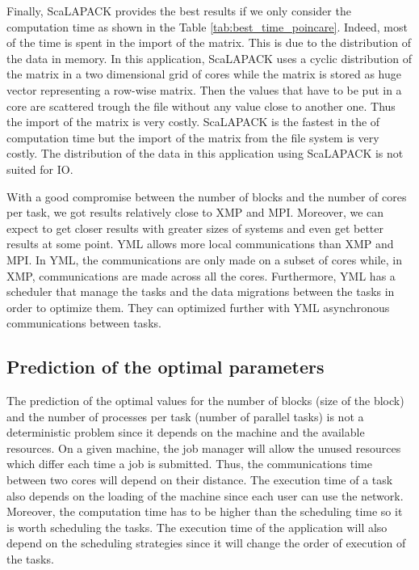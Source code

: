 Finally, ScaLAPACK provides the best results if we only consider the computation time as shown in the Table \ref{tab:best_time_poincare}.
Indeed, most of the time is spent in the import of the matrix.
This is due to the distribution of the data in memory.
In this application, ScaLAPACK uses a cyclic distribution of the matrix in a two dimensional grid of cores while the matrix is stored as huge vector representing a row-wise matrix.
Then the values that have to be put in a core are scattered trough the file without any value close to another one.
Thus the import of the matrix is very costly.
ScaLAPACK is the fastest in the of computation time but the import of the matrix from the file system is very costly.
The distribution of the data in this application using ScaLAPACK is not suited for IO.

With a good compromise between the number of blocks and the number of cores per task, we got results relatively close to XMP and MPI.
Moreover, we can expect to get closer results with greater sizes of systems and even get better results at some point.
YML allows more local communications than XMP and MPI.
In YML, the communications are only made on a subset of cores while, in XMP, communications are made across all the cores.
Furthermore, YML has a scheduler that manage the tasks and the data migrations between the tasks in order to optimize them.
They can optimized further with YML asynchronous communications between tasks.






\subsection{Prediction of the optimal parameters}
The prediction of the optimal values for the number of blocks (size of the block) and the number of processes per task (number of parallel tasks) is not a deterministic problem since it depends on the machine and the available resources.
On a given machine, the job manager will allow the unused resources which differ each time a job is submitted.
Thus, the communications time between two cores will depend on their distance.
The execution time of a task also depends on the loading of the machine since each user can use the network.
Moreover, the computation time has to be higher than the scheduling time so it is worth scheduling the tasks.
The execution time of the application will also depend on the scheduling strategies since it will change the order of execution of the tasks.

